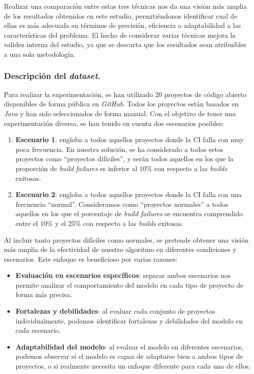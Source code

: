 Realizar una comparación entre estas tres técnicas nos da una visión más amplia de los
resultados obtenidos en este estudio, permitiéndonos identificar cual de ellas es más adecuada en
términos de precisión, eficiencia o adaptabilidad a las características del problema. El hecho
de considerar varias técnicas mejora la validez interna del estudio, ya que se descarta que los
resultados sean atribuibles a una sola metodología.

\subsubsection{Descripción del \textit{dataset}.}
Para realizar la experimentación, se han utilizado $20$ proyectos de código abierto disponibles
de forma pública en \textit{GitHub}. Todos los proyectos están basados en \textit{Java} y
han sido seleccionados de forma manual. Con el objetivo de tener una experimentación diversa,
se han tenido en cuenta dos escenarios posibles:

\begin{enumerate}
    \item \textbf{Escenario 1}: engloba a todos aquellos proyectos donde la  CI falla con muy
    poca frecuencia. En nuestra solución, se ha considerado a todos estos proyectos como
    ``proyectos difíciles'', y serán todos aquellos en los que la proporción de \textit{build
    failures} es inferior al $10\%$ con respecto a las \textit{builds} exitosas.\\

    \item \textbf{Escenario 2}: engloba a todos aquellos proyectos donde la CI falla con
    una frecuencia ``normal''. Consideramos como ``proyectos normales'' a todos aquellos en los
    que el porcentaje de \textit{build failures} se encuentra comprendido entre el $10\%$ y el
    $25\%$ con respecto a las \textit{builds} exitosas.
\end{enumerate}

Al incluir tanto proyectos difíciles como normales, se pretende obtener una visión más amplia
de la efectividad de nuestro algoritmo en diferentes condiciones y escenarios. Este enfoque
es beneficioso por varias razones:

\begin{itemize}
    \item \textbf{Evaluación en escenarios específicos}: separar ambos escenarios nos permite
    analizar el comportamiento del modelo en cada tipo de proyecto de forma más precisa.\\

    \item \textbf{Fortalezas y debilidades}: al evaluar cada conjunto de proyectos individualmente,
    podemos identificar fortalezas y debilidades del modelo en cada escenario.\\

    \item \textbf{Adaptabilidad del modelo}: al evaluar el modelo en diferentes escenarios, podemos
    observar si el modelo es capaz de adaptarse bien a ambos tipos de proyectos, o si realmente
    necesita un enfoque diferente para cada uno de ellos.
\end{itemize}

